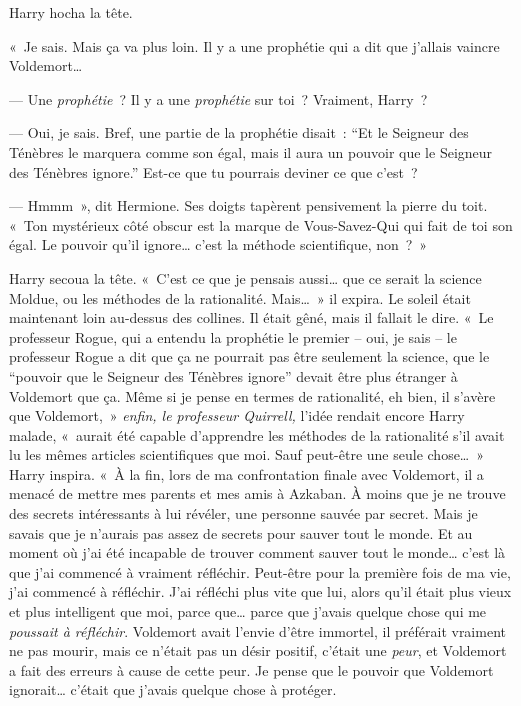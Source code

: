 Harry hocha la tête.

«~Je sais. Mais ça va plus loin. Il y a une prophétie qui a dit que j'allais vaincre Voldemort…

--- Une \emph{prophétie}~? Il y a une \emph{prophétie} sur toi~? Vraiment, Harry~?

--- Oui, je sais. Bref, une partie de la prophétie disait~: “Et le Seigneur des Ténèbres le marquera comme son égal, mais il aura un pouvoir que le Seigneur des Ténèbres ignore.” Est-ce que tu pourrais deviner ce que c'est~?

--- Hmmm~», dit Hermione. Ses doigts tapèrent pensivement la pierre du toit. «~Ton mystérieux côté obscur est la marque de Vous-Savez-Qui qui fait de toi son égal. Le pouvoir qu'il ignore… c'est la méthode scientifique, non~?~»

Harry secoua la tête. «~C'est ce que je pensais aussi… que ce serait la science Moldue, ou les méthodes de la rationalité. Mais…~» il expira. Le soleil était maintenant loin au-dessus des collines. Il était gêné, mais il fallait le dire. «~Le professeur Rogue, qui a entendu la prophétie le premier -- oui, je sais -- le professeur Rogue a dit que ça ne pourrait pas être seulement la science, que le “pouvoir que le Seigneur des Ténèbres ignore” devait être plus étranger à Voldemort que ça. Même si je pense en termes de rationalité, eh bien, il s'avère que Voldemort,~» \emph{enfin, le professeur Quirrell,} l'idée rendait encore Harry malade, «~aurait été capable d'apprendre les méthodes de la rationalité s'il avait lu les mêmes articles scientifiques que moi. Sauf peut-être une seule chose…~» Harry inspira. «~À la fin, lors de ma confrontation finale avec Voldemort, il a menacé de mettre mes parents et mes amis à Azkaban. À moins que je ne trouve des secrets intéressants à lui révéler, une personne sauvée par secret. Mais je savais que je n'aurais pas assez de secrets pour sauver tout le monde. Et au moment où j'ai été incapable de trouver comment sauver tout le monde… c'est là que j'ai commencé à vraiment réfléchir. Peut-être pour la première fois de ma vie, j'ai commencé à réfléchir. J'ai réfléchi plus vite que lui, alors qu'il était plus vieux et plus intelligent que moi, parce que… parce que j'avais quelque chose qui me \emph{poussait à réfléchir}. Voldemort avait l'envie d'être immortel, il préférait vraiment ne pas mourir, mais ce n'était pas un désir positif, c'était une \emph{peur}, et Voldemort a fait des erreurs à cause de cette peur. Je pense que le pouvoir que Voldemort ignorait… c'était que j'avais quelque chose à protéger.

